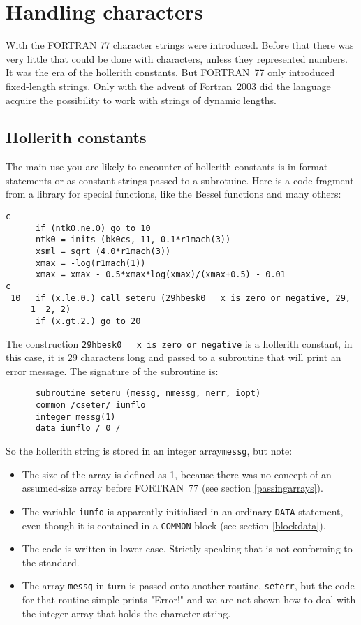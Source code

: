 \section{Handling characters}
With the FORTRAN 77 character strings were introduced. Before that there was very little
that could be done with characters, unless they represented numbers. It was the era
of the hollerith constants. But FORTRAN~77 only introduced fixed-length strings.
Only with the advent of Fortran~2003 did the language acquire the possibility to
work with strings of dynamic lengths.


\subsection{Hollerith constants}
The main use you are likely to encounter of hollerith constants is in format statements or
as constant strings passed to a subrotuine. Here is
a code fragment from a library for special functions, like the Bessel functions and
many others:
\begin{verbatim}
c
      if (ntk0.ne.0) go to 10
      ntk0 = inits (bk0cs, 11, 0.1*r1mach(3))
      xsml = sqrt (4.0*r1mach(3))
      xmax = -log(r1mach(1))
      xmax = xmax - 0.5*xmax*log(xmax)/(xmax+0.5) - 0.01
c
 10   if (x.le.0.) call seteru (29hbesk0   x is zero or negative, 29,
     1  2, 2)
      if (x.gt.2.) go to 20
\end{verbatim}

The construction \verb+29hbesk0   x is zero or negative+ is a hollerith constant, in
this case, it is 29 characters long and passed to a subroutine that will print an
error message. The signature of the subroutine is:
\begin{verbatim}
      subroutine seteru (messg, nmessg, nerr, iopt)
      common /cseter/ iunflo
      integer messg(1)
      data iunflo / 0 /
\end{verbatim}

So the hollerith string is stored in an integer array\verb+messg+, but note:
\begin{itemize}
\item
The size of the array is defined as 1, because there was no concept of an assumed-size array
before FORTRAN~77 (see section \ref{passingarrays}).
\item
The variable \verb+iunfo+ is apparently initialised in an ordinary \verb+DATA+ statement,
even though it is contained in a \verb+COMMON+ block (see section \ref{blockdata}).
\item
The code is written in lower-case. Strictly speaking that is not conforming to the standard.
\item
The array \verb+messg+ in turn is passed onto another routine, \verb+seterr+, but the code
for that routine simple prints "Error!" and we are not shown how to deal with the integer
array that holds the character string.
\end{itemize}

